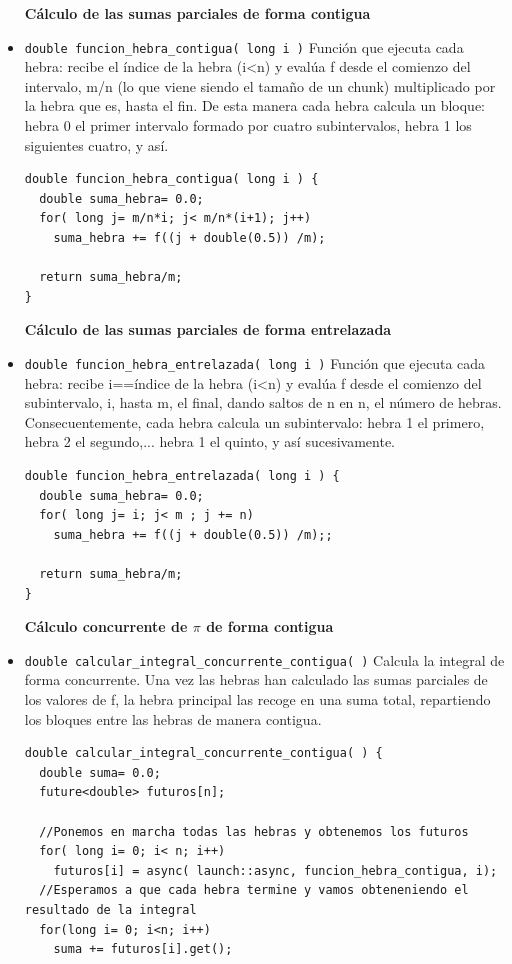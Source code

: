 \documentclass[12pt]{article}
\begin{document}
\begin{itemize}[wide, nosep, labelindent = 0pt, topsep = 1ex]
\item[\textbf{Cálculo de las sumas parciales de forma contigua}]
\item \verb|double funcion_hebra_contigua( long i )| Función que ejecuta cada hebra: recibe el índice de la hebra (i<n) y evalúa f desde el comienzo del intervalo, m/n (lo que viene siendo el tamaño de un chunk) multiplicado por la hebra que es, hasta el fin. De esta manera cada hebra calcula un bloque: hebra 0 el primer intervalo formado por cuatro subintervalos, hebra 1 los siguientes cuatro, y así.
\begin{lstlisting}
double funcion_hebra_contigua( long i ) {
  double suma_hebra= 0.0;
  for( long j= m/n*i; j< m/n*(i+1); j++)
    suma_hebra += f((j + double(0.5)) /m);

  return suma_hebra/m;
}
\end{lstlisting}
\item[\textbf{Cálculo de las sumas parciales de forma entrelazada}]
\item \verb|double funcion_hebra_entrelazada( long i )| Función que ejecuta cada hebra: recibe i==índice de la hebra (i<n) y evalúa f desde el comienzo del subintervalo, i, hasta m, el final, dando saltos de n en n, el número de hebras. Consecuentemente, cada hebra calcula un subintervalo: hebra 1 el primero, hebra 2 el segundo,... hebra 1 el quinto, y así sucesivamente.
\begin{lstlisting}
double funcion_hebra_entrelazada( long i ) {
  double suma_hebra= 0.0;
  for( long j= i; j< m ; j += n)
    suma_hebra += f((j + double(0.5)) /m);;

  return suma_hebra/m;
}
\end{lstlisting}
\item[\textbf{Cálculo concurrente de $\pi$ de forma contigua}]
\item \verb|double calcular_integral_concurrente_contigua( )| Calcula la integral de forma concurrente. Una vez las hebras han calculado las sumas parciales de los valores de f, la hebra principal las recoge en una suma total,
repartiendo los bloques entre las hebras de manera contigua.
\begin{lstlisting}
double calcular_integral_concurrente_contigua( ) {
  double suma= 0.0;
  future<double> futuros[n];

  //Ponemos en marcha todas las hebras y obtenemos los futuros
  for( long i= 0; i< n; i++)
    futuros[i] = async( launch::async, funcion_hebra_contigua, i);
  //Esperamos a que cada hebra termine y vamos obteneniendo el resultado de la integral
  for(long i= 0; i<n; i++)
    suma += futuros[i].get();


\end{lstlisting}
\end{itemize}
\end{document}
